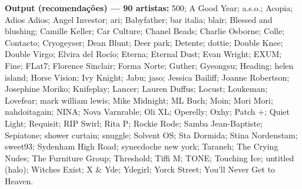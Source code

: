 \begin{apendicesenv}
\noindent\textbf{Output (recomendações) --- 90 artistas:} 500; A Good Year; a.s.o.; Acopia; Adios Adios; Angel Investor; ari; Babyfather; bar italia; blair; Blessed and blushing; Camille Keller; Car Culture; Chanel Beads; Charlie Osborne; Colle; Contacto; Cryogeyser; Dean Blunt; Deer park; Detente; dottie; Double Knee; Double Virgo; Elvira del Rocío; Eterna; Eternal Dust; Evan Wright; EXUM; Fine; FLat7; Florence Sinclair; Forma Norte; Guther; Gyeongsu; Heading; helen island; Horse Vision; Ivy Knight; Jabu; jaso; Jessica Bailiff; Joanne Robertson; Josephine Moriko; Knifeplay; Lancer; Lauren Duffus; Locust; Loukeman; Lovefear; mark william lewis; Mike Midnight; ML Buch; Moin; Mori Mori; nahdoitagain; NINA; Nova Varnrable; Oli XL; Operelly; Oxhy; Patch +; Quiet Light; Requisit; RIP Swirl; Rita P; Rockie Rode; Samba Jean-Baptiste; Sepiatone; shower curtain; snuggle; Solvent OS; Sta Dormida; Stina Nordenstam; sweet93; Sydenham High Road; synecdoche new york; Taraneh; The Crying Nudes; The Furniture Group; Threshold; Tiffi M; TONE; Touching Ice; untitled (halo); Witches Exist; X \& Yde; Ydegirl; Yorck Street; You'll Never Get to Heaven.

\end{apendicesenv}
